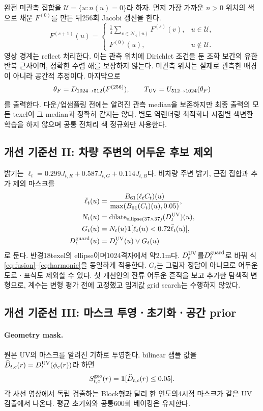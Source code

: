 \documentclass[11pt,a4paper]{article}
\newcommand{\ind}{\mathbf{1}}
\newcommand{\dilate}{\operatorname{dilate}}
\begin{document}
완전 미관측 집합을 $\mathcal U=\{u:n(u)=0\}$라 하자. 먼저 가장 가까운 $n>0$ 위치의 색으로 채운 $F^{(0)}$를 만든 뒤256회 Jacobi 갱신을 한다.
\begin{equation}
 F^{(s+1)}(u)=
 \begin{cases}
 \frac14\sum_{v\in\mathcal N_4(u)}F^{(s)}(v),&u\in\mathcal U,\\
 F^{(0)}(u),&u\notin\mathcal U.
 \end{cases}\label{eq:harmonic}
\end{equation}
영상 경계는 reflect 처리한다. 이는 관측 위치에 Dirichlet 조건을 둔 조화 보간의 유한 반복 근사이며, 정확한 수렴 해를 보장하지 않는다. 미관측 위치는 실제로 관측한 배경이 아니라 공간적 추정이다. 마지막으로
\begin{equation}
 \theta_F=D_{1024\to512}(F^{(256)}),\qquad T_{\rm UV}=U_{512\to1024}(\theta_F)
\end{equation}
를 출력한다. 다운/업샘플링 전에는 알려진 관측 median을 보존하지만 최종 출력의 모든 texel이 그 median과 정확히 같지는 않다. 별도 역렌더링 최적화나 시점별 색변환 학습을 하지 않으며 공통 전처리 색 정규화만 사용한다.

\subsection{개선 기준선 II: 차량 주변의 어두운 후보 제외}
밝기는 $\ell_t=0.299J_{t,R}+0.587J_{t,G}+0.114J_{t,B}$다. 비차량 주변 밝기, 근접 집합과 추가 제외 마스크를
\begin{align}
 \bar\ell_t(u)&=\frac{B_{61}(\ell_t C_t)(u)}{\max(B_{61}(C_t)(u),0.05)},\\
 N_t(u)&=\dilate_{\rm ellipse(37\times37)}(D_t^{\rm UV})(u),\\
 G_t(u)&=N_t(u)\ind[\ell_t(u)<0.72\bar\ell_t(u)],\\
 D_t^{\rm guard}(u)&=D_t^{\rm UV}(u)\lor G_t(u)
\end{align}
로 둔다. 반경18texel의 ellipse이며1024격자에서 약2.1m다. $D_t^{\rm UV}$를$D_t^{\rm guard}$로 바꿔 식\eqref{eq:fusion}--\eqref{eq:harmonic}을 동일하게 적용한다. $G_t$는 그림자 정답이 아니므로 어두운 도로ㆍ표식도 제외할 수 있다. 첫 개선안의 잔류 어두운 흔적을 보고 추가한 탐색적 변형으로, 계수는 변형 평가 전에 고정했고 임계값 grid search는 수행하지 않았다.

\subsection{개선 기준선 III: 마스크 투영ㆍ초기화ㆍ공간 prior}
\paragraph{Geometry mask.}
원본 UV의 마스크를 알려진 기하로 투영한다. bilinear 샘플 값을 $\widehat D_{t,c}(r)=D_t^{\rm UV}(\phi_c(r))$라 하면
\begin{equation}
 S_{t,c}^{\rm geo}(r)=\ind[\widehat D_{t,c}(r)\le0.05].
\end{equation}
각 사선 영상에서 독립 검출하는 Block형과 달리 한 연도의4시점 마스크가 같은 UV 검출에서 나온다. 평균 초기화와 공통600회 베이킹은 유지한다.
\end{document}
